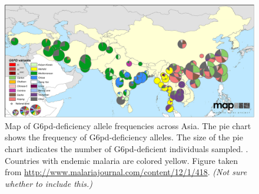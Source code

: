 \documentclass{article}
\newcommand{\gc}[1]{{\it\color{green}(#1)} }
\begin{document}
\begin{figure}[ht]
\begin{center}
  \includegraphics[width=1.0\textwidth]{G6pd_Howes_et_al_1475-2875-12-418-4}   %
\caption{ 
Map of G6pd-deficiency allele frequencies across Asia. The pie chart shows
  the frequency of G6pd-deficiency alleles. The size of the pie chart
  indicates the number of G6pd-deficient individuals sampled.
. Countries with
  endemic malaria are colored yellow. Figure taken from
  \citet{Howes-g6pd-variants}
  \url{http://www.malariajournal.com/content/12/1/418}. \gc{Not sure
    whether to include this.}
} \label{fig-G6PD-map}
\end{center}
\end{figure}




\end{document}
